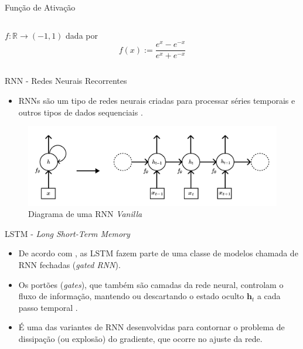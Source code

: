 \documentclass{beamer}
\newcommand{\R}{\mathds{R}}
\newcommand{\bs}[1]{\boldsymbol{#1}}
\begin{document}
\begin{frame}{Função de Ativação}
\begin{columns}[onlytextwidth,t]
\begin{column}{0.48\textwidth}
	            $f:\R \rightarrow (-1,1)$ dada por 
                \[f(x) := \frac{e^{x}-e^{-x}}{e^{x}+e^{-x}}\]
 
            \end{column}
        \end{columns}
    \end{frame}

    \begin{frame}{RNN - Redes Neurais Recorrentes}
        \begin{itemize}
            \item RNNs são um tipo de redes neurais criadas para processar séries temporais e outros tipos de dados sequenciais \citep{fan2021}.
        \end{itemize}
        \begin{figure}
           \includegraphics[scale=0.3]{figuras/rnn_hidden_state.pdf}
		    \caption{Diagrama de uma RNN \textit{Vanilla} \citep[adaptado de][]{goodfellow2016, kamath2019}}
	    \end{figure}
    \end{frame}

    \begin{frame}{LSTM - \textit{Long Short-Term Memory}}
        \begin{itemize}
            \justifying
            \item De acordo com \citet{goodfellow2016}, as LSTM fazem parte de uma classe de modelos chamada de RNN fechadas (\textit{gated RNN}).
            \item Os portões (\textit{gates}), que também são camadas da rede neural, controlam o fluxo de informação, mantendo ou descartando o estado oculto $\bs{h}_{t}$ a cada passo temporal \citep{kamath2019}.
            \item É uma das variantes de RNN desenvolvidas para contornar o problema de dissipação (ou explosão) do gradiente, que ocorre no ajuste da rede.
        \end{itemize}  
    \end{frame}
    
\end{document}
